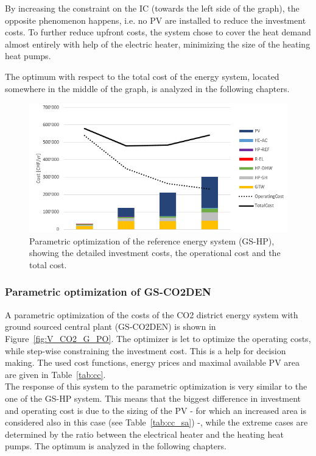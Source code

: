 \documentclass{article}
\begin{document}
By increasing the constraint on the IC (towards the left side of the graph), the opposite phenomenon happens, i.e. no PV are installed to reduce the investment costs. To further reduce upfront costs, the system chose to cover the heat demand almost entirely with help of the electric heater, minimizing the size of the heating heat pumps.

The optimum with respect to the total cost of the energy system, located somewhere in the middle of the graph, is analyzed in the following chapters.

\begin{figure}[htp]
	\centering
	\includegraphics[width=1\textwidth]{V_G_PO1.png}
	\caption{Parametric optimization of the reference energy system (GS-HP), showing the detailed investment costs, the operational cost and the total cost.}
	\label{fig:V_G_PO}
\end{figure}

\subsubsection{Parametric optimization of GS-CO2DEN}
A parametric optimization of the costs of the CO2 district energy system with ground sourced central plant (GS-CO2DEN) is shown in Figure~\ref{fig:V_CO2_G_PO}. The optimizer is let to optimize the operating costs, while step-wise constraining the investment cost. This is a help for decision making. The used cost functions, energy prices and maximal available PV area are given in Table~\ref{tab:cc}. \\ 

The response of this system to the parametric optimization is very similar to the one of the GS-HP system. This means that the biggest difference in investment and operating cost is due to the sizing of the PV - for which an increased area is considered also in this case (see Table~\ref{tab:cc_sa}) -, while the extreme cases are determined by the ratio between the electrical heater and the heating heat pumps. The optimum is analyzed in the following chapters.\\
\end{document}
